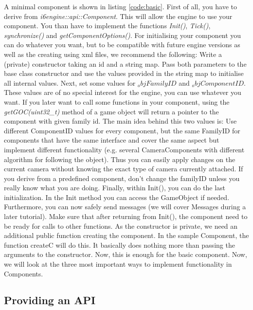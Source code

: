 \documentclass{article}
\begin{document}
A minimal component is shown in listing \ref{code:basic}. First of all, you have to derive from \textit{i6engine::api::Component}. This will allow the engine to use your component. You than have to implement the functions \textit{Init()}, \textit{Tick()}, \textit{synchronize()} and \textit{getComponentOptions()}. For initialising your component you can do whatever you want, but to be compatible with future engine versions as well as the creating using xml files, we recommend the following: Write a (private) constructor taking an id and a string map. Pass both parameters to the base class constructor and use the values provided in the string map to initialise all internal values. Next, set some values for \textit{$_objFamilyID$} and \textit{$_objComponentID$}. These values are of no special interest for the engine, you can use whatever you want. If you later want to call some functions in your component, using the \textit{getGOC(uint32_t)} method of a game object will return a pointer to the component with given family id. The main idea behind this two values is: Use different ComponentID values for every component, but the same FamilyID for components that have the same interface and cover the same aspect but implement different functionality (e.g. several CameraComponents with different algorithm for following the object). Thus you can easily apply changes on the current camera without knowing the exact type of camera currently attached. If you derive from a predefined component, don't change the familyID unless you really know what you are doing. Finally, within Init(), you can do the last initialization. In the Init method you can access the GameObject if needed. Furthermore, you can now safely send messages (we will cover Messages during a later tutorial). Make sure that after returning from Init(), the component need to be ready for calls to other functions.\newline
As the constructor is private, we need an additional public function creating the component. In the sample Component, the function createC will do this. It basically does nothing more than passing the arguments to the constructor.\newline
Now, this is enough for the basic component. Now, we will look at the three most important ways to implement functionality in Components.



\subsection{Providing an API}
\end{document}
